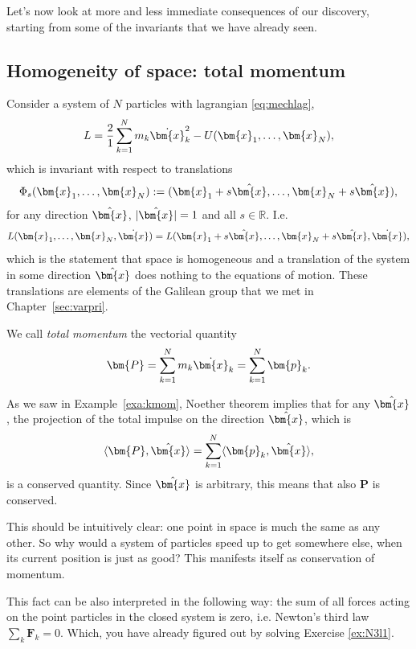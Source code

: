 \documentclass[english,fontsize=11pt,paper=a5,oneside]{scrbook}
\newcommand{\R}{\mathbb{R}}
\newcommand{\bx}{\bm{x}}
\newcommand{\lag}{\langle}
\newcommand{\rag}{\rangle}
\theoremstyle{definition}
\begin{document}
Let's now look at more and less immediate consequences of our discovery, starting from some of the invariants that we have already seen.

\subsection{Homogeneity of space: total momentum}

Consider a system of $N$ particles with lagrangian \eqref{eq:mechlag},
\begin{equation}
    L = \frac21 \sum_{k=1}^N m_k \dot \bx_k^2 - U(\bx_1, \ldots, \bx_N),
\end{equation}
which is invariant with respect to translations
\begin{equation}
    \Phi_s(\bx_1, \ldots, \bx_N) := (\bx_1 + s \hat \bx,\ldots, \bx_N + s \hat \bx),
\end{equation}
for any direction $\hat\bx$, $|\hat\bx|=1$ and all $s\in\R$. I.e.
\begin{equation}
    L(\bx_1, \ldots, \bx_N, \dot \bx) = L(\bx_1 + s \hat\bx, \ldots, \bx_N + s \hat\bx, \dot \bx),
\end{equation}
which is the statement that space is homogeneous and a translation of the system in some direction $\hat\bx$ does nothing to the equations of motion. These translations are elements of the Galilean group that we met in Chapter~\ref{sec:varpri}.

We call \emph{total momentum} the vectorial quantity
\begin{equation}
    \bm{P} = \sum_{k=1}^N m_k \dot \bx_k = \sum_{k=1}^N \bm{p}_k.
\end{equation}

As we saw in Example~\ref{exa:kmom}, Noether theorem implies that for any $\hat\bx$, the projection of the total impulse on the direction $\hat\bx$, which is
\begin{equation}
    \lag\bm{P}, \hat\bx\rag = \sum_{k=1}^N \lag \bm{p}_k, \hat\bx\rag,
\end{equation}
is a conserved quantity.
Since $\hat\bx$ is arbitrary, this means that also $\bm{P}$ is conserved.

This should be intuitively clear: one point in space is much the same as any other. So why would a system of particles speed up to get somewhere else, when its current position is just as good? This manifests itself as conservation of momentum.

This fact can be also interpreted in the following way: the sum of all forces acting on the point particles in the closed system is zero, i.e. Newton's third law $\sum_k \bm{F}_k = 0$. Which, you have already figured out by solving Exercise \ref{ex:N3l1}.
\end{document}
